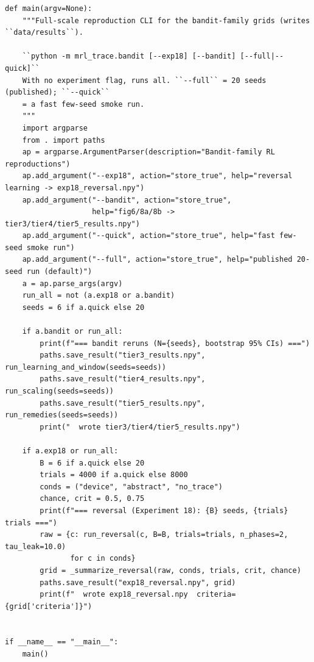 \begin{lstlisting}[caption={mrl\_trace/bandit.py},label={lst:siox-src-bandit}]
def main(argv=None):
    """Full-scale reproduction CLI for the bandit-family grids (writes ``data/results``).

    ``python -m mrl_trace.bandit [--exp18] [--bandit] [--full|--quick]``
    With no experiment flag, runs all. ``--full`` = 20 seeds (published); ``--quick``
    = a fast few-seed smoke run.
    """
    import argparse
    from . import paths
    ap = argparse.ArgumentParser(description="Bandit-family RL reproductions")
    ap.add_argument("--exp18", action="store_true", help="reversal learning -> exp18_reversal.npy")
    ap.add_argument("--bandit", action="store_true",
                    help="fig6/8a/8b -> tier3/tier4/tier5_results.npy")
    ap.add_argument("--quick", action="store_true", help="fast few-seed smoke run")
    ap.add_argument("--full", action="store_true", help="published 20-seed run (default)")
    a = ap.parse_args(argv)
    run_all = not (a.exp18 or a.bandit)
    seeds = 6 if a.quick else 20

    if a.bandit or run_all:
        print(f"=== bandit reruns (N={seeds}, bootstrap 95% CIs) ===")
        paths.save_result("tier3_results.npy", run_learning_and_window(seeds=seeds))
        paths.save_result("tier4_results.npy", run_scaling(seeds=seeds))
        paths.save_result("tier5_results.npy", run_remedies(seeds=seeds))
        print("  wrote tier3/tier4/tier5_results.npy")

    if a.exp18 or run_all:
        B = 6 if a.quick else 20
        trials = 4000 if a.quick else 8000
        conds = ("device", "abstract", "no_trace")
        chance, crit = 0.5, 0.75
        print(f"=== reversal (Experiment 18): {B} seeds, {trials} trials ===")
        raw = {c: run_reversal(c, B=B, trials=trials, n_phases=2, tau_leak=10.0)
               for c in conds}
        grid = _summarize_reversal(raw, conds, trials, crit, chance)
        paths.save_result("exp18_reversal.npy", grid)
        print(f"  wrote exp18_reversal.npy  criteria={grid['criteria']}")


if __name__ == "__main__":
    main()
\end{lstlisting}

